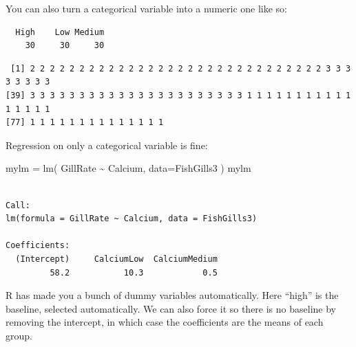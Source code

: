 \documentclass[
  letterpaper,
  DIV=11,
  numbers=noendperiod]{scrreprt}
\newenvironment{Shaded}{}{}
\newcommand{\AttributeTok}[1]{\textcolor[rgb]{0.49,0.56,0.16}{#1}}
\newcommand{\FunctionTok}[1]{\textcolor[rgb]{0.02,0.16,0.49}{#1}}
\newcommand{\NormalTok}[1]{#1}
\newcommand{\OtherTok}[1]{\textcolor[rgb]{0.00,0.44,0.13}{#1}}
\newcommand{\SpecialCharTok}[1]{\textcolor[rgb]{0.25,0.44,0.63}{#1}}
\begin{document}
You can also turn a categorical variable into a numeric one like so:

\begin{Shaded}
\end{Shaded}

\begin{verbatim}
  High    Low Medium 
    30     30     30 
\end{verbatim}

\begin{Shaded}
\end{Shaded}

\begin{verbatim}
 [1] 2 2 2 2 2 2 2 2 2 2 2 2 2 2 2 2 2 2 2 2 2 2 2 2 2 2 2 2 2 2 3 3 3 3 3 3 3 3
[39] 3 3 3 3 3 3 3 3 3 3 3 3 3 3 3 3 3 3 3 3 3 3 1 1 1 1 1 1 1 1 1 1 1 1 1 1 1 1
[77] 1 1 1 1 1 1 1 1 1 1 1 1 1 1
\end{verbatim}

Regression on only a categorical variable is fine:

\begin{Shaded}
\begin{Highlighting}[]
\NormalTok{mylm }\OtherTok{=} \FunctionTok{lm}\NormalTok{( GillRate }\SpecialCharTok{\textasciitilde{}}\NormalTok{ Calcium, }\AttributeTok{data=}\NormalTok{FishGills3 )}
\NormalTok{mylm}
\end{Highlighting}
\end{Shaded}

\begin{verbatim}

Call:
lm(formula = GillRate ~ Calcium, data = FishGills3)

Coefficients:
  (Intercept)     CalciumLow  CalciumMedium  
         58.2           10.3            0.5  
\end{verbatim}

R has made you a bunch of dummy variables automatically. Here ``high''
is the baseline, selected automatically. We can also force it so there
is no baseline by removing the intercept, in which case the coefficients
are the means of each group.
\end{document}

